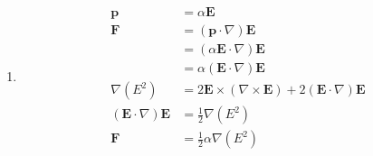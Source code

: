 \documentclass{article}
\renewcommand{\vec}[1]{\boldsymbol{\mathbf{#1}}}
\begin{document}
\begin{enumerate}
  \item

        \begin{align*}
          \vec{p}                        & = \alpha \vec{E}                                                              \\
          \vec{F}                        & = (\vec{p} \cdot \nabla) \vec{E}                                              \\
                                         & = (\alpha \vec{E} \cdot \nabla) \vec{E}                                       \\
                                         & = \alpha (\vec{E} \cdot \nabla) \vec{E}                                       \\
          \nabla (E^2)                   & = 2 \vec{E} \times (\nabla \times \vec{E}) + 2 (\vec{E} \cdot \nabla) \vec{E} \\
          (\vec{E} \cdot \nabla) \vec{E} & = \frac{1}{2} \nabla (E^2)                                                    \\
          \vec{F}                        & = \frac{1}{2} \alpha \nabla (E^2)
        \end{align*}
\end{enumerate}

\subsection{}
\end{document}
